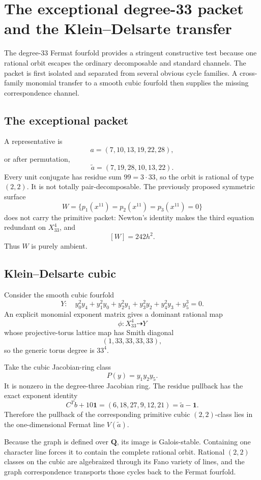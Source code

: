 \documentclass[11pt,oneside]{book}
\theoremstyle{definition}
\theoremstyle{remark}
\newcommand{\Q}{\mathbf{Q}}
\begin{document}
\chapter{The exceptional degree-33 packet and the Klein--Delsarte transfer}
The degree-33 Fermat fourfold provides a stringent constructive test because one rational orbit escapes the ordinary decomposable and standard channels. The packet is first isolated and separated from several obvious cycle families. A cross-family monomial transfer to a smooth cubic fourfold then supplies the missing correspondence channel.

\section{The exceptional packet}
A representative is
\[
a=(7,10,13,19,22,28),
\]
or after permutation,
\[
\widetilde a=(7,19,28,10,13,22).
\]
Every unit conjugate has residue sum \(99=3\cdot33\), so the orbit is rational of type \((2,2)\). It is not totally pair-decomposable. The previously proposed symmetric surface
\[
W=\{p_1(x^{11})=p_2(x^{11})=p_3(x^{11})=0\}
\]
does not carry the primitive packet: Newton's identity makes the third equation redundant on \(X_{33}^4\), and
\[
[W]=242h^2.
\]
Thus \(W\) is purely ambient.

\section{Klein--Delsarte cubic}
Consider the smooth cubic fourfold
\[
Y:\quad y_0^2y_4+y_1^2y_0+y_2^2y_1+y_3^2y_2+y_4^2y_3+y_5^3=0.
\]
An explicit monomial exponent matrix gives a dominant rational map
\[
\phi:X_{33}^4\dashrightarrow Y
\]
whose projective-torus lattice map has Smith diagonal
\[
(1,33,33,33,33),
\]
so the generic torus degree is \(33^4\).

Take the cubic Jacobian-ring class
\[
P(y)=y_1y_2y_5.
\]
It is nonzero in the degree-three Jacobian ring. The residue pullback has the exact exponent identity
\[
C^Tb+10\mathbf1=(6,18,27,9,12,21)=\widetilde a-\mathbf1.
\tag{10.1}
\]
Therefore the pullback of the corresponding primitive cubic \((2,2)\)-class lies in the one-dimensional Fermat line \(V(\widetilde a)\).

Because the graph is defined over \(\Q\), its image is Galois-stable. Containing one character line forces it to contain the complete rational orbit. Rational \((2,2)\) classes on the cubic are algebraized through its Fano variety of lines, and the graph correspondence transports those cycles back to the Fermat fourfold.
\end{document}
